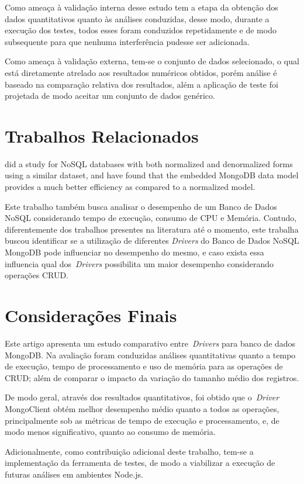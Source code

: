 \documentclass[12pt]{article}
\begin{document}
Como ameaça à validação interna desse estudo tem a etapa da obtenção dos dados quantitativos quanto às análises conduzidas, desse modo, durante a execução dos testes, todos esses foram conduzidos repetidamente e de modo subsequente para que nenhuma interferência pudesse ser adicionada.

Como ameaça à validação externa, tem-se o conjunto de dados selecionado, o qual está diretamente atrelado aos resultados numéricos obtidos, porém análise é baseado na comparação relativa dos resultados, além a aplicação de teste foi projetada de modo aceitar um conjunto de dados genérico.

\section{Trabalhos Relacionados} 
\label{section:relacionados}

\cite{kanade2014study} did a study for NoSQL databases with both normalized and denormalized forms using a similar dataset, and have found that the embedded MongoDB
data model provides a much better efficiency as compared to a normalized model. 

Este trabalho também busca analisar o desempenho de um Banco de Dados NoSQL considerando tempo de execução, consumo de CPU e Memória. Contudo, diferentemente dos trabalhos presentes na literatura até o momento, este trabalha buscou identificar se a utilização de diferentes \emph{Drivers} do Banco de Dados NoSQL MongoDB pode influenciar no desempenho do mesmo, e caso exista essa influencia qual dos~\emph{Drivers} possibilita um maior desempenho considerando operações CRUD.

\section{Considerações Finais}
\label{section:consideracoes}

Este artigo apresenta um estudo comparativo entre~\emph{Drivers} para banco de dados MongoDB.
Na avaliação foram conduzidas análises quantitativas quanto a tempo de execução, tempo de processamento e uso de memória para as operações de CRUD; além de comparar o impacto da variação do tamanho médio dos registros.

De modo geral, através dos resultados quantitativos, foi obtido que o~\emph{Driver} MongoClient obtém melhor desempenho médio quanto a todos as operações, principalmente sob as métricas de tempo de execução e processamento, e, de modo menos significativo, quanto ao consumo de memória.

Adicionalmente, como contribuição adicional deste trabalho, tem-se a implementação da ferramenta de testes, de modo a viabilizar a execução de futuras análises em ambientes Node.js.




\end{document}
